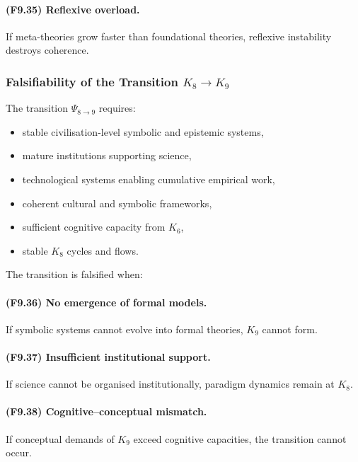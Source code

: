 \paragraph{(F9.35) Reflexive overload.}
If meta-theories grow faster than foundational theories,
reflexive instability destroys coherence.



\subsubsection{Falsifiability of the Transition \texorpdfstring{$K_8 \to K_9$}{K_8 \to K_9}}

The transition $\Psi_{8\to 9}$ requires:

\begin{itemize}
    \item stable civilisation-level symbolic and epistemic systems,
    \item mature institutions supporting science,
    \item technological systems enabling cumulative empirical work,
    \item coherent cultural and symbolic frameworks,
    \item sufficient cognitive capacity from $K_6$,
    \item stable $K_8$ cycles and flows.
\end{itemize}

The transition is falsified when:

\paragraph{(F9.36) No emergence of formal models.}
If symbolic systems cannot evolve into formal theories,
$K_9$ cannot form.

\paragraph{(F9.37) Insufficient institutional support.}
If science cannot be organised institutionally,
paradigm dynamics remain at $K_8$.

\paragraph{(F9.38) Cognitive–conceptual mismatch.}
If conceptual demands of $K_9$ exceed cognitive capacities,
the transition cannot occur.

